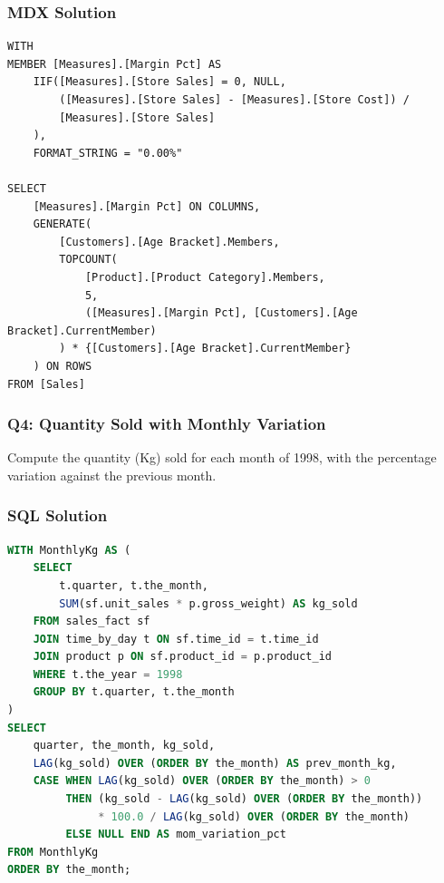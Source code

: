 \subsubsection*{MDX Solution}
\begin{lstlisting}[language=MDX]
WITH
MEMBER [Measures].[Margin Pct] AS
    IIF([Measures].[Store Sales] = 0, NULL,
        ([Measures].[Store Sales] - [Measures].[Store Cost]) /
        [Measures].[Store Sales]
    ),
    FORMAT_STRING = "0.00%"

SELECT
    [Measures].[Margin Pct] ON COLUMNS,
    GENERATE(
        [Customers].[Age Bracket].Members,
        TOPCOUNT(
            [Product].[Product Category].Members,
            5,
            ([Measures].[Margin Pct], [Customers].[Age Bracket].CurrentMember)
        ) * {[Customers].[Age Bracket].CurrentMember}
    ) ON ROWS
FROM [Sales]
\end{lstlisting}

\subsubsection{Q4: Quantity Sold with Monthly Variation}
\label{subsec:ex-q4}

\begin{theorybox}[frametitle={Exercise}]
Compute the quantity (Kg) sold for each month of 1998, with the percentage variation against the previous month.
\end{theorybox}

\subsubsection*{SQL Solution}
\begin{lstlisting}[language=SQL]
WITH MonthlyKg AS (
    SELECT
        t.quarter, t.the_month,
        SUM(sf.unit_sales * p.gross_weight) AS kg_sold
    FROM sales_fact sf
    JOIN time_by_day t ON sf.time_id = t.time_id
    JOIN product p ON sf.product_id = p.product_id
    WHERE t.the_year = 1998
    GROUP BY t.quarter, t.the_month
)
SELECT
    quarter, the_month, kg_sold,
    LAG(kg_sold) OVER (ORDER BY the_month) AS prev_month_kg,
    CASE WHEN LAG(kg_sold) OVER (ORDER BY the_month) > 0
         THEN (kg_sold - LAG(kg_sold) OVER (ORDER BY the_month))
              * 100.0 / LAG(kg_sold) OVER (ORDER BY the_month)
         ELSE NULL END AS mom_variation_pct
FROM MonthlyKg
ORDER BY the_month;
\end{lstlisting}

